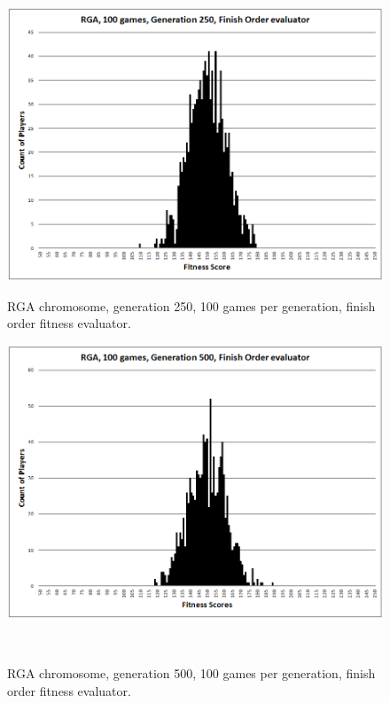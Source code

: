\begin{figure}
\centering
\begin{minipage}[t]{0.47\linewidth}
\centering
\includegraphics[width=1.0\linewidth]{Figures/RGA_1024_G250_N100_FO.png}
\caption[RGA Fitness Distribution, 250th Generation]{RGA chromosome, generation
250, 100 games per generation, finish order fitness evaluator.} \label{figure-RGA-250th_gen_fitness}
\end{minipage}%
\hspace{0.06\linewidth}%
\begin{minipage}[t]{0.47\linewidth}
\centering
\includegraphics[width=1.0\linewidth]{Figures/RGA_1024_G500_N100_FO.png}
\caption[RGA Fitness Distribution, 500th Generation]{RGA chromosome, generation
500, 100 games per generation, finish order fitness evaluator.} \label{figure-RGA-500th_gen_fitness}
\end{minipage}
\\[\intextsep]


\end{figure}
